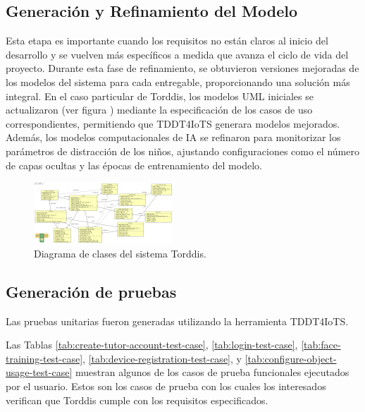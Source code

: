 \documentclass[a4paper,fleqn]{cas-sc}
\begin{document}
		\subsection{Generación y Refinamiento del Modelo}
			Esta etapa es importante cuando los requisitos no están claros al inicio del desarrollo y se vuelven más específicos a medida que avanza el ciclo de vida del proyecto. Durante esta fase de refinamiento, se obtuvieron versiones mejoradas de los modelos del sistema para cada entregable, proporcionando una solución más integral. En el caso particular de Torddis, los modelos UML iniciales se actualizaron (ver figura ) mediante la especificación de los casos de uso correspondientes, permitiendo que TDDT4IoTS generara modelos mejorados. Además, los modelos computacionales de IA se refinaron para monitorizar los parámetros de distracción de los niños, ajustando configuraciones como el número de capas ocultas y las épocas de entrenamiento del modelo.
			
			\begin{figure}[hbt!]
				\centering
				\includegraphics[frame,scale=0.5, width=\linewidth]{figs/Figure_8}
				\caption{Diagrama de clases del sistema Torddis.\label{fig:ClassDiagram}}
			\end{figure} 
			
		\subsection{Generación de pruebas}
			Las pruebas unitarias fueron generadas utilizando la herramienta TDDT4IoTS.
			
			Las Tablas \ref{tab:create-tutor-account-test-case}, \ref{tab:login-test-case}, \ref{tab:face-training-test-case}, \ref{tab:device-registration-test-case}, y \ref{tab:configure-object-usage-test-case} muestran algunos de los casos de prueba funcionales ejecutados por el usuario. Estos son los casos de prueba con los cuales los interesados verifican que Torddis cumple con los requisitos especificados.
			
\end{document}
